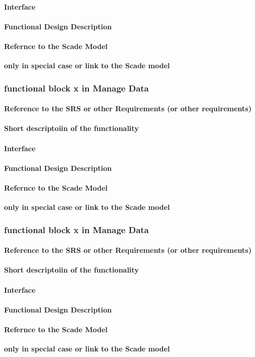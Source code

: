 \paragraph{Interface}
\paragraph{Functional Design Description}
\paragraph{Refernce to the Scade Model}
\textbf{only in special case or link to the Scade model}

\subsubsection{functional block x in Manage Data}%
\paragraph{Reference to the SRS or other Requirements (or other requirements)}
\paragraph{Short descriptoiin of the functionality}
\paragraph{Interface}
\paragraph{Functional Design Description}
\paragraph{Refernce to the Scade Model}
\textbf{only in special case or link to the Scade model}

\subsubsection{functional block x in Manage Data}%
\paragraph{Reference to the SRS or other Requirements (or other requirements)}
\paragraph{Short descriptoiin of the functionality}
\paragraph{Interface}
\paragraph{Functional Design Description}
\paragraph{Refernce to the Scade Model}
\textbf{only in special case or link to the Scade model}

